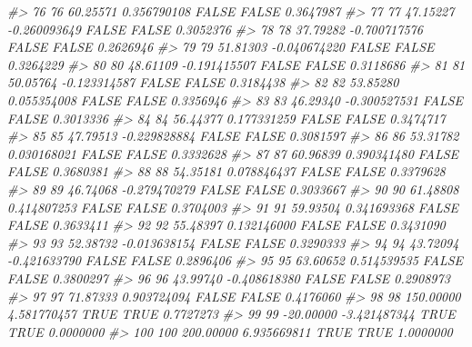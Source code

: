 \documentclass[
  oneside]{book}
\newenvironment{Shaded}{\begin{snugshade}}{\end{snugshade}}
\newcommand{\CommentTok}[1]{\textcolor[rgb]{0.56,0.35,0.01}{\textit{#1}}}
\begin{document}
\begin{Shaded}
\begin{Highlighting}[]
\CommentTok{\#\textgreater{} 76   76  60.25571  0.356790108     FALSE       FALSE        0.3647987}
\CommentTok{\#\textgreater{} 77   77  47.15227 {-}0.260093649     FALSE       FALSE        0.3052376}
\CommentTok{\#\textgreater{} 78   78  37.79282 {-}0.700717576     FALSE       FALSE        0.2626946}
\CommentTok{\#\textgreater{} 79   79  51.81303 {-}0.040674220     FALSE       FALSE        0.3264229}
\CommentTok{\#\textgreater{} 80   80  48.61109 {-}0.191415507     FALSE       FALSE        0.3118686}
\CommentTok{\#\textgreater{} 81   81  50.05764 {-}0.123314587     FALSE       FALSE        0.3184438}
\CommentTok{\#\textgreater{} 82   82  53.85280  0.055354008     FALSE       FALSE        0.3356946}
\CommentTok{\#\textgreater{} 83   83  46.29340 {-}0.300527531     FALSE       FALSE        0.3013336}
\CommentTok{\#\textgreater{} 84   84  56.44377  0.177331259     FALSE       FALSE        0.3474717}
\CommentTok{\#\textgreater{} 85   85  47.79513 {-}0.229828884     FALSE       FALSE        0.3081597}
\CommentTok{\#\textgreater{} 86   86  53.31782  0.030168021     FALSE       FALSE        0.3332628}
\CommentTok{\#\textgreater{} 87   87  60.96839  0.390341480     FALSE       FALSE        0.3680381}
\CommentTok{\#\textgreater{} 88   88  54.35181  0.078846437     FALSE       FALSE        0.3379628}
\CommentTok{\#\textgreater{} 89   89  46.74068 {-}0.279470279     FALSE       FALSE        0.3033667}
\CommentTok{\#\textgreater{} 90   90  61.48808  0.414807253     FALSE       FALSE        0.3704003}
\CommentTok{\#\textgreater{} 91   91  59.93504  0.341693368     FALSE       FALSE        0.3633411}
\CommentTok{\#\textgreater{} 92   92  55.48397  0.132146000     FALSE       FALSE        0.3431090}
\CommentTok{\#\textgreater{} 93   93  52.38732 {-}0.013638154     FALSE       FALSE        0.3290333}
\CommentTok{\#\textgreater{} 94   94  43.72094 {-}0.421633790     FALSE       FALSE        0.2896406}
\CommentTok{\#\textgreater{} 95   95  63.60652  0.514539535     FALSE       FALSE        0.3800297}
\CommentTok{\#\textgreater{} 96   96  43.99740 {-}0.408618380     FALSE       FALSE        0.2908973}
\CommentTok{\#\textgreater{} 97   97  71.87333  0.903724094     FALSE       FALSE        0.4176060}
\CommentTok{\#\textgreater{} 98   98 150.00000  4.581770457      TRUE        TRUE        0.7727273}
\CommentTok{\#\textgreater{} 99   99 {-}20.00000 {-}3.421487344      TRUE        TRUE        0.0000000}
\CommentTok{\#\textgreater{} 100 100 200.00000  6.935669811      TRUE        TRUE        1.0000000}
\end{Highlighting}
\end{Shaded}
\end{document}

